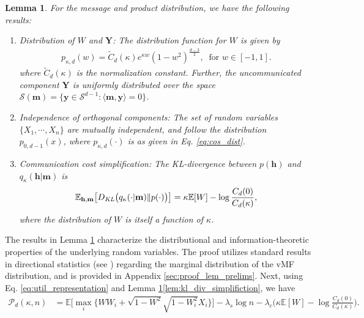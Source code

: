 \documentclass[12pt]{article}
\newcommand{\EE}{\mathbb E}
\newtheorem{lemma}[theorem]{Lemma}
\theoremstyle{definition}
\theoremstyle{remark}
\begin{document}
\begin{lemma}
\label{lem:prelim_results}
For the message and product distribution, we have the following results:
\begin{enumerate}[label=(\roman*)]
    \item \label{lem:fidelity_dist} \emph{Distribution of $W$ and $\mathbf{Y}$:} The distribution function for $W$ is given by
    \begin{align}
    \label{eq:cos_dist}
        p_{\kappa,d}(w) = \tilde{C}_d(\kappa) e^{\kappa w} \left(1-w^2\right)^{\frac{d-3}{2}}, \ \text{ for } w \in [-1,1].
    \end{align}
    where $\tilde{C}_d(\kappa)$ is the normalization constant. Further, the uncommunicated component $\mathbf{Y}$ is uniformly distributed over the space $\mathcal{S}(\mathbf{m}) = \{ \mathbf y \in \mathcal{S}^{d-1}: \langle \mathbf{m} , \mathbf{y} \rangle = 0\}$.

    \item \label{lem:X_independence}  \emph{Independence of orthogonal components:} The set of random variables $\{X_1, \cdots, X_n\}$ are mutually independent, and follow the distribution $p_{0,d-1}(x)$, where $p_{\kappa,d}(\cdot)$ is as given in Eq. \eqref{eq:cos_dist}.

    \item \label{lem:kl_div_simplifiction} \emph{Communication cost simplification:}  The KL-divergence between $p(\mathbf{h})$ and $q_\kappa(\mathbf{h} | \mathbf{m})$ is
    \begin{align*}
        \EE_{\mathbf{h},\mathbf{m}} \big[D_{\emph{KL}}\big(q_{\kappa}(\cdot | \mathbf{m}) \| p(\cdot)\big) \big] =  \kappa \EE[W] -\log \frac{C_d(0)}{C_d(\kappa)},
    \end{align*}
    where the distribution of $W$ is itself a function of $\kappa$.
\end{enumerate}
\end{lemma}
The results in Lemma \ref{lem:prelim_results} characterize the distributional and information-theoretic properties of the underlying random variables. The proof utilizes standard results in directional statistics (see \citep{mardia2009directional}) regarding the marginal distribution of the vMF distribution, and is provided in Appendix \ref{sec:proof_lem_prelims}. Next, using Eq. \eqref{eq:util_representation} and Lemma \ref{lem:prelim_results}\ref{lem:kl_div_simplifiction}, we have
\begin{align*}
    \mathcal{P}_d(\kappa,n) &= \mathbb E \Big[\max_i \big\{  W W_i + \sqrt{1-W^2} \sqrt{1-W_i^2} X_i \big\}\Big] - \lambda_s \log n - \lambda_c \Big(\kappa \EE[W] - \log \frac{C_d(0)}{C_d(\kappa)}\Big).
\end{align*}
\end{document}
